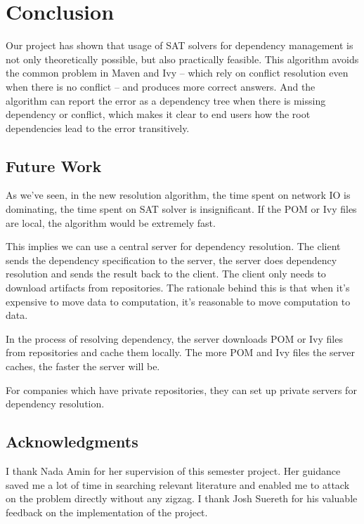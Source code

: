 \section{Conclusion}

Our project has shown that usage of SAT solvers for dependency management is not only theoretically possible, but also practically feasible. This algorithm avoids the common problem in Maven and Ivy -- which rely on conflict resolution even when there is no conflict -- and produces more correct answers. And the algorithm can report the error as a dependency tree when there is missing dependency or conflict, which makes it clear to end users how the root dependencies lead to the error transitively.


\subsection{Future Work}

As we've seen, in the new resolution algorithm, the time spent on network IO is dominating, the time spent on SAT solver is insignificant. If the POM or Ivy files are local, the algorithm would be extremely fast.

This implies we can use a central server for dependency resolution. The client sends the dependency specification to the server, the server does dependency resolution and sends the result back to the client. The client only needs to download artifacts from repositories. The rationale behind this is that when it's expensive to move data to computation, it's reasonable to move computation to data.

In the process of resolving dependency, the server downloads POM or Ivy files from repositories and cache them locally. The more POM and Ivy files the server caches, the faster the server will be.

For companies which have private repositories, they can set up private servers for dependency resolution.

\subsection{Acknowledgments}

I thank Nada Amin for her supervision of this semester project. Her guidance saved me a lot of time in searching relevant literature and enabled me to attack on the problem directly without any zigzag. I thank Josh Suereth for his valuable feedback on the implementation of the project.
